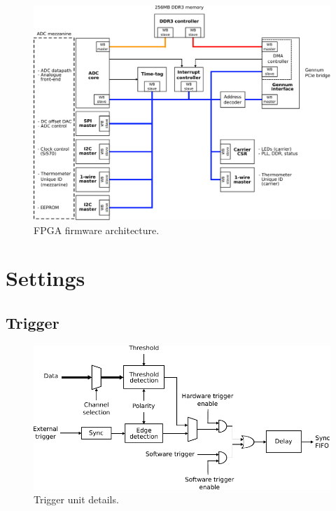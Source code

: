 \documentclass[11pt,a4paper]{article}
\begin{document}
\begin{figure}[h!]
  \includegraphics[width=\textwidth]{figures/firmware_arch.pdf}
  \caption{FPGA firmware architecture.}
  \label{fig:firmware_arch}
\end{figure}

\section{Settings}


\subsection{Trigger}

\begin{figure}[h!]
  \includegraphics[width=\textwidth]{figures/trigger_unit.pdf}
  \caption{Trigger unit details.}
  \label{fig:trigger_unit}
\end{figure}
\end{document}
